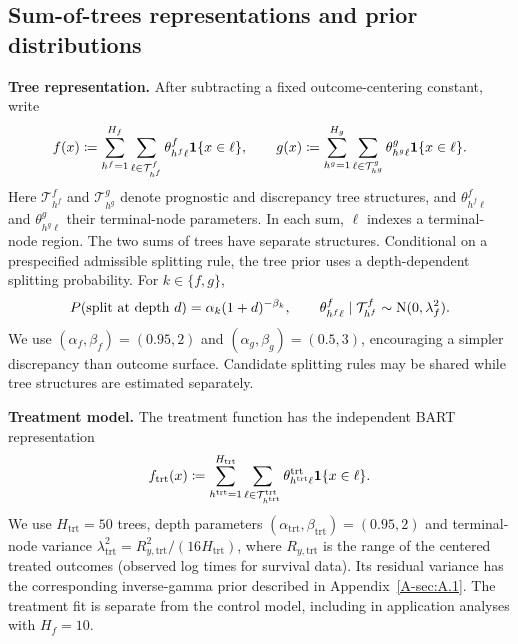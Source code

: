\documentclass[11pt]{article}
\begin{document}
\subsection{Sum-of-trees representations and prior distributions}
\noindent\textbf{Tree representation.}
After subtracting a fixed outcome-centering constant, write
\begin{equation}\label{eq:trees}
f(x)\coloneqq \sum_{h^f=1}^{H_f}\sum_{\ell\in\mathcal T_{h^f}^f}\theta^f_{h^f\ell}\mathbf{1}\{x\in\ell\},\qquad
g(x)\coloneqq \sum_{h^g=1}^{H_g}\sum_{\ell\in\mathcal T_{h^g}^g}\theta^g_{h^g\ell}\mathbf{1}\{x\in\ell\}.
\end{equation}
Here $\mathcal T_{h^f}^f$ and $\mathcal T_{h^g}^g$ denote prognostic and discrepancy tree structures, and $\theta^f_{h^f\ell}$ and $\theta^g_{h^g\ell}$ their terminal-node parameters. In each sum, $\ell$ indexes a terminal-node region. The two sums of trees have separate structures. Conditional on a prespecified admissible splitting rule, the tree prior uses a depth-dependent splitting probability. For $k\in\{f,g\}$,
\begin{equation}\label{eq:treeprior}
P(\text{split at depth }d)=\alpha_k(1+d)^{-\beta_k},\qquad
\theta^f_{h^f\ell}\mid \mathcal T_{h^f}^f\sim\mathrm{N}(0,\lambda_f^2).
\end{equation}
We use $(\alpha_f,\beta_f)=(0.95,2)$ and $(\alpha_g,\beta_g)=(0.5,3)$, encouraging a simpler discrepancy than outcome surface. Candidate splitting rules may be shared while tree structures are estimated separately.

\noindent\textbf{Treatment model.}
The treatment function has the independent BART representation
\[
f_{\mathrm{trt}}(x)\coloneqq
\sum_{h^{\mathrm{trt}}=1}^{H_{\mathrm{trt}}}
\sum_{\ell\in\mathcal T_{h^{\mathrm{trt}}}^{\mathrm{trt}}}
\theta^{\mathrm{trt}}_{h^{\mathrm{trt}}\ell}\mathbf{1}\{x\in\ell\}.
\]
We use $H_{\mathrm{trt}}=50$ trees, depth parameters $(\alpha_{\mathrm{trt}},\beta_{\mathrm{trt}})=(0.95,2)$ and terminal-node variance $\lambda_{\mathrm{trt}}^2=R_{y,\mathrm{trt}}^2/(16H_{\mathrm{trt}})$, where $R_{y,\mathrm{trt}}$ is the range of the centered treated outcomes (observed log times for survival data). Its residual variance has the corresponding inverse-gamma prior described in Appendix~\ref{A-sec:A.1}. The treatment fit is separate from the control model, including in application analyses with $H_f=10$.
\end{document}
